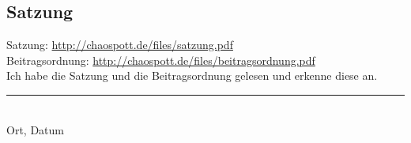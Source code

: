 \begin{Form}
\section*{Satzung}
Satzung: \url{http://chaospott.de/files/satzung.pdf}\\
Beitragsordnung: \url{http://chaospott.de/files/beitragsordnung.pdf}\\[3mm]
\CheckBox[name=10,bordercolor=black]{} Ich habe die Satzung und die Beitragsordnung gelesen und erkenne diese an.\\[1.2cm]


\noindent\rule{6cm}{0.4pt}
\tab{\noindent\rule{6cm}{0.4pt}}\\
Ort, Datum
\end{Form}

